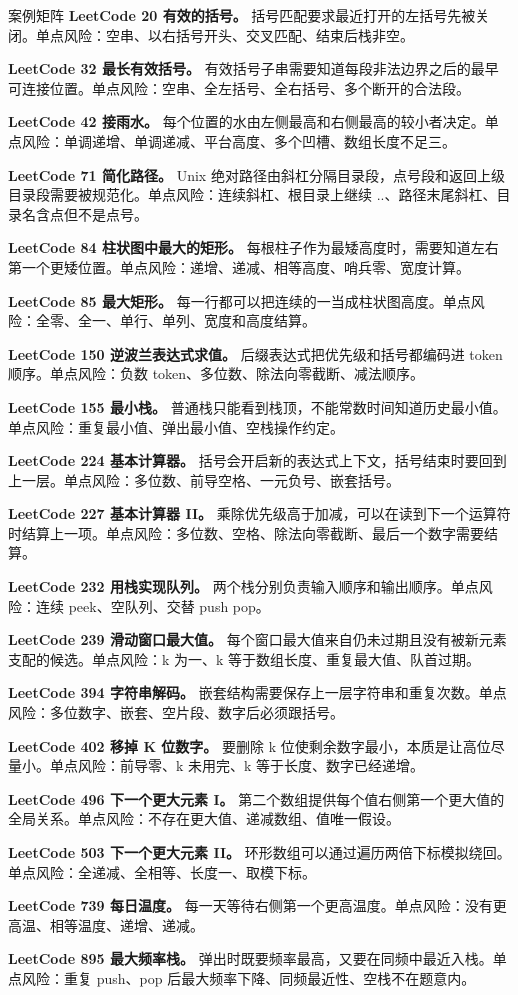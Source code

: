 \begin{principlebox}{案例矩阵}
\textbf{LeetCode 20 有效的括号。}
括号匹配要求最近打开的左括号先被关闭。单点风险：空串、以右括号开头、交叉匹配、结束后栈非空。

\textbf{LeetCode 32 最长有效括号。}
有效括号子串需要知道每段非法边界之后的最早可连接位置。单点风险：空串、全左括号、全右括号、多个断开的合法段。

\textbf{LeetCode 42 接雨水。}
每个位置的水由左侧最高和右侧最高的较小者决定。单点风险：单调递增、单调递减、平台高度、多个凹槽、数组长度不足三。

\textbf{LeetCode 71 简化路径。}
Unix 绝对路径由斜杠分隔目录段，点号段和返回上级目录段需要被规范化。单点风险：连续斜杠、根目录上继续 ..、路径末尾斜杠、目录名含点但不是点号。

\textbf{LeetCode 84 柱状图中最大的矩形。}
每根柱子作为最矮高度时，需要知道左右第一个更矮位置。单点风险：递增、递减、相等高度、哨兵零、宽度计算。

\textbf{LeetCode 85 最大矩形。}
每一行都可以把连续的一当成柱状图高度。单点风险：全零、全一、单行、单列、宽度和高度结算。

\textbf{LeetCode 150 逆波兰表达式求值。}
后缀表达式把优先级和括号都编码进 token 顺序。单点风险：负数 token、多位数、除法向零截断、减法顺序。

\textbf{LeetCode 155 最小栈。}
普通栈只能看到栈顶，不能常数时间知道历史最小值。单点风险：重复最小值、弹出最小值、空栈操作约定。

\textbf{LeetCode 224 基本计算器。}
括号会开启新的表达式上下文，括号结束时要回到上一层。单点风险：多位数、前导空格、一元负号、嵌套括号。

\textbf{LeetCode 227 基本计算器 II。}
乘除优先级高于加减，可以在读到下一个运算符时结算上一项。单点风险：多位数、空格、除法向零截断、最后一个数字需要结算。

\textbf{LeetCode 232 用栈实现队列。}
两个栈分别负责输入顺序和输出顺序。单点风险：连续 peek、空队列、交替 push pop。

\textbf{LeetCode 239 滑动窗口最大值。}
每个窗口最大值来自仍未过期且没有被新元素支配的候选。单点风险：k 为一、k 等于数组长度、重复最大值、队首过期。

\textbf{LeetCode 394 字符串解码。}
嵌套结构需要保存上一层字符串和重复次数。单点风险：多位数字、嵌套、空片段、数字后必须跟括号。

\textbf{LeetCode 402 移掉 K 位数字。}
要删除 k 位使剩余数字最小，本质是让高位尽量小。单点风险：前导零、k 未用完、k 等于长度、数字已经递增。

\textbf{LeetCode 496 下一个更大元素 I。}
第二个数组提供每个值右侧第一个更大值的全局关系。单点风险：不存在更大值、递减数组、值唯一假设。

\textbf{LeetCode 503 下一个更大元素 II。}
环形数组可以通过遍历两倍下标模拟绕回。单点风险：全递减、全相等、长度一、取模下标。

\textbf{LeetCode 739 每日温度。}
每一天等待右侧第一个更高温度。单点风险：没有更高温、相等温度、递增、递减。

\textbf{LeetCode 895 最大频率栈。}
弹出时既要频率最高，又要在同频中最近入栈。单点风险：重复 push、pop 后最大频率下降、同频最近性、空栈不在题意内。

\end{principlebox}

